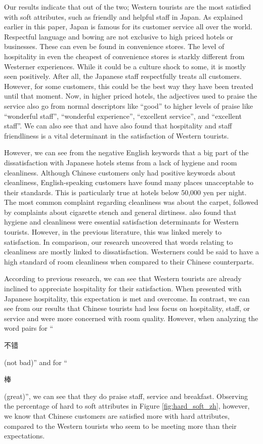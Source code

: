 \documentclass[smallextended,natbib]{svjour3}       %
\begin{document}
    Our results indicate that out of the two; Western tourists are the most satisfied with soft attributes, such as friendly and helpful staff in Japan. As explained earlier in this paper, Japan is famous for its customer service all over the world. Respectful language and bowing are not exclusive to high priced hotels or businesses. These can even be found in convenience stores. The level of hospitality in even the cheapest of convenience stores is starkly different from Westerner experiences. While it could be a culture shock to some, it is mostly seen positively. After all, the Japanese staff respectfully treats all customers. However, for some customers, this could be the best way they have been treated until that moment. Now, in higher priced hotels, the adjectives used to praise the service also go from normal descriptors like ``good'' to higher levels of praise like ``wonderful staff'', ``wonderful experience'', ``excellent service'', and ``excellent staff''. We can also see that \cite{kozak2002} and \cite{shanka2004} have also found that hospitality and staff friendliness is a vital determinant in the satisfaction of Western tourists.

    However, we can see from the negative English keywords that a big part of the dissatisfaction with Japanese hotels stems from a lack of hygiene and room cleanliness. Although Chinese customers only had positive keywords about cleanliness, English-speaking customers have found many places unacceptable to their standards. This is particularly true at hotels below 50,000 yen per night. The most common complaint regarding cleanliness was about the carpet, followed by complaints about cigarette stench and general dirtiness. \cite{kozak2002} also found that hygiene and cleanliness were essential satisfaction determinants for Western tourists. However, in the previous literature, this was linked merely to satisfaction. In comparison, our research uncovered that words relating to cleanliness are mostly linked to dissatisfaction. Westerners could be said to have a high standard of room cleanliness when compared to their Chinese counterparts.

    According to previous research, we can see that Western tourists are already inclined to appreciate hospitality for their satisfaction. When presented with Japanese hospitality, this expectation is met and overcome. In contrast, we can see from our results that Chinese tourists had less focus on hospitality, staff, or service and were more concerned with room quality. However, when analyzing the word pairs for ``\begin{CJK}{UTF8}{gbsn}不错\end{CJK} (not bad)'' and for ``\begin{CJK}{UTF8}{gbsn}棒\end{CJK} (great)'', we can see that they do praise staff, service and breakfast. Observing the percentage of hard to soft attributes in Figure \ref{fig:hard_soft_zh}, however, we know that Chinese customers are satisfied more with hard attributes, compared to the Western tourists who seem to be meeting more than their expectations.
\end{document}
